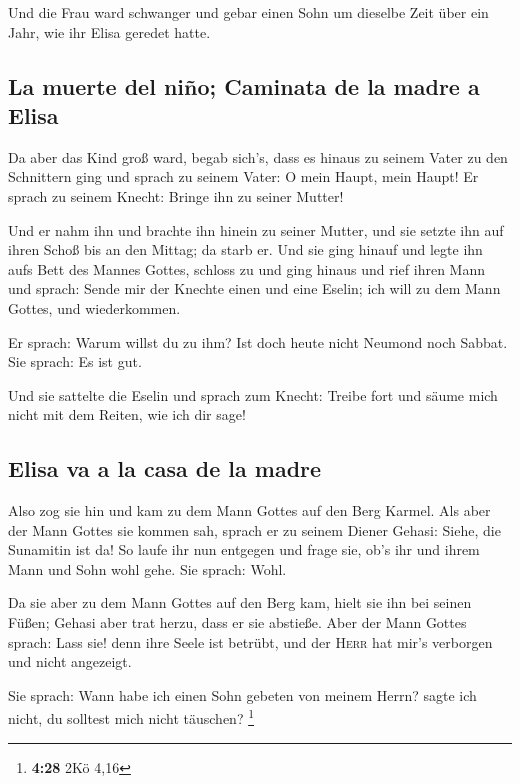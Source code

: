  Und die Frau ward schwanger und gebar einen Sohn um
dieselbe Zeit über ein Jahr, wie ihr Elisa geredet hatte.

\hypertarget{la-muerte-del-niuxf1o-caminata-de-la-madre-a-elisa}{%
\subsection{La muerte del niño; Caminata de la madre a
Elisa}\label{la-muerte-del-niuxf1o-caminata-de-la-madre-a-elisa}}

 Da aber das Kind groß ward, begab sich's, dass es hinaus
zu seinem Vater zu den Schnittern ging  und sprach zu
seinem Vater: O mein Haupt, mein Haupt! Er sprach zu seinem Knecht:
Bringe ihn zu seiner Mutter!

 Und er nahm ihn und brachte ihn hinein zu seiner Mutter,
und sie setzte ihn auf ihren Schoß bis an den Mittag; da starb er.
 Und sie ging hinauf und legte ihn aufs Bett des Mannes
Gottes, schloss zu und ging hinaus  und rief ihren Mann
und sprach: Sende mir der Knechte einen und eine Eselin; ich will zu dem
Mann Gottes, und wiederkommen.

 Er sprach: Warum willst du zu ihm? Ist doch heute nicht
Neumond noch Sabbat. Sie sprach: Es ist gut.

 Und sie sattelte die Eselin und sprach zum Knecht:
Treibe fort und säume mich nicht mit dem Reiten, wie ich dir sage!

\hypertarget{elisa-va-a-la-casa-de-la-madre}{%
\subsection{Elisa va a la casa de la
madre}\label{elisa-va-a-la-casa-de-la-madre}}

 Also zog sie hin und kam zu dem Mann Gottes auf den Berg
Karmel. Als aber der Mann Gottes sie kommen sah, sprach er zu seinem
Diener Gehasi: Siehe, die Sunamitin ist da!  So laufe ihr
nun entgegen und frage sie, ob's ihr und ihrem Mann und Sohn wohl gehe.
Sie sprach: Wohl.

 Da sie aber zu dem Mann Gottes auf den Berg kam, hielt
sie ihn bei seinen Füßen; Gehasi aber trat herzu, dass er sie abstieße.
Aber der Mann Gottes sprach: Lass sie! denn ihre Seele ist betrübt, und
der \textsc{Herr} hat mir's verborgen und nicht angezeigt.

 Sie sprach: Wann habe ich einen Sohn gebeten von meinem
Herrn? sagte ich nicht, du solltest mich nicht täuschen? \footnote{\textbf{4:28}
  2Kö 4,16}

